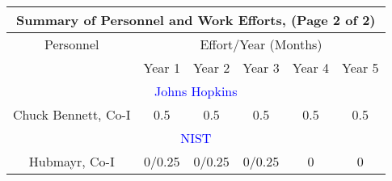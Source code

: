 \documentclass[12pt]{article}
\begin{document}
\begin{table}[h] %
\begin{center}
\begin{tabular}{|c|c|c|c|c|c|} \hline 
\multicolumn{6}{|c|}{Summary of Personnel and Work Efforts, (Page 2 of 2)}              \\ \hline
Personnel & \multicolumn{5}{c|}{Effort/Year (Months)}  \\ \cline{2-6}
                 & Year 1  & Year 2 & Year 3 & Year 4    &  Year 5    \\ \hline
\multicolumn{6}{|c|}{\textcolor{blue}{Johns Hopkins} }  \\ \hline
Chuck Bennett, Co-I               & 0.5 & 0.5 & 0.5 & 0.5  & 0.5   \\ \hline
\multicolumn{6}{|c|}{\textcolor{blue}{NIST } }  \\ \hline
Hubmayr, Co-I    &  0/0.25 & 0/0.25 & 0/0.25 & 0 &  0 \\ \hline

\end{tabular}
\end{center}
\end{table}
\end{document}
